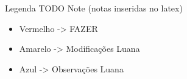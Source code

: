 \documentclass[tc,oneside]{iiufrgs}
\begin{document}
	
	
	
    

	\listoftodos
    \newpage
     Legenda TODO Note (notas inseridas no latex)
	\begin{itemize}
	\item \color{red} Vermelho -> FAZER 
	\color{black}
	\item \color{yellow} Amarelo -> Modificações Luana
	\color{black}
	\item \color{blue} Azul -> Observações Luana
	\end{itemize}
\end{document}

